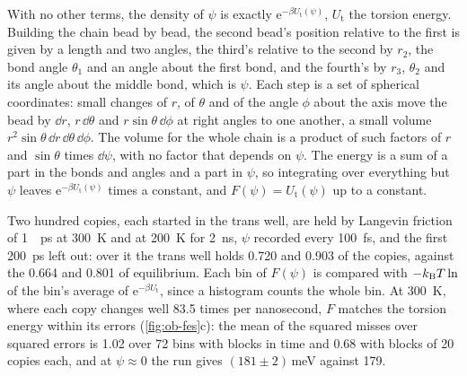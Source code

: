 With no other terms, the density of $\psi$ is exactly $\mathrm{e}^{-\beta
U_{\mathrm t}(\psi)}$, $U_{\mathrm t}$ the torsion energy. Building the
chain bead by bead, the second bead's position relative to the first is
given by a length and two angles, the third's relative to the second by
$r_2$, the bond angle $\theta_1$ and an angle about the first bond, and
the fourth's by $r_3$, $\theta_2$ and its angle about the middle bond,
which is $\psi$. Each step is a set of spherical coordinates: small
changes of $r$, of $\theta$ and of the angle $\phi$ about the axis move the
bead by $\dd r$, $r\,\dd\theta$ and $r\sin\theta\,\dd\phi$ at right angles
to one another, a small volume $r^2\sin\theta\,\dd r\,\dd\theta\,\dd\phi$.
The volume for the whole chain is a product of such factors of $r$ and
$\sin\theta$ times $\dd\psi$, with no factor that depends on $\psi$. The energy is a sum of a part in the bonds and angles
and a part in $\psi$, so integrating over everything but $\psi$ leaves
$\mathrm{e}^{-\beta U_{\mathrm t}(\psi)}$ times a constant, and $F(\psi) =
U_{\mathrm t}(\psi)$ up to a constant.

Two hundred copies, each started in the trans well, are held by Langevin
friction of \SI{1}{\per\pico\second} at \SI{300}{\kelvin} and at
\SI{200}{\kelvin} for \SI{2}{\nano\second}, $\psi$ recorded every
\SI{100}{\femto\second}, and the first \SI{200}{\pico\second} left out:
over it the trans well holds 0.720 and 0.903 of the copies, against the
0.664 and 0.801 of equilibrium. Each bin of $F(\psi)$ is compared with
$-k_{\mathrm{B}} T\ln$ of the bin's average of $\mathrm{e}^{-\beta U_{\mathrm t}}$,
since a histogram counts the whole bin. At \SI{300}{\kelvin}, where each
copy changes well 83.5 times per nanosecond, $F$ matches the torsion
energy within its errors (\cref{fig:ob-fes}c): the mean of the squared
misses over squared errors is 1.02 over 72 bins with blocks in time and
0.68 with blocks of 20 copies each, and at $\psi \approx 0$ the run gives
$(181 \pm 2)$\,\si{\milli\electronvolt} against 179.

